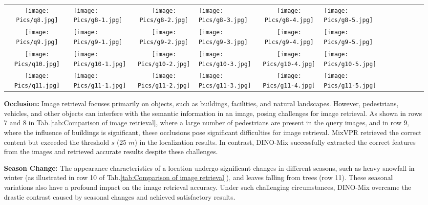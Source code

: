 \begin{table*}[!t]
\begin{tabular}{ c p{2cm} c p{2cm} c p{2cm} c p{2cm} c p{2cm} c p{2cm}}
 \texttt{[image: Pics/q8.jpg]}& \texttt{[image: Pics/g8-1.jpg]}&\texttt{[image: Pics/g8-2.jpg]}&\texttt{[image: Pics/g8-3.jpg]}&\texttt{[image: Pics/g8-4.jpg]}&\texttt{[image: Pics/g8-5.jpg]} \\
 \texttt{[image: Pics/q9.jpg]}& \texttt{[image: Pics/g9-1.jpg]}&\texttt{[image: Pics/g9-2.jpg]}&\texttt{[image: Pics/g9-3.jpg]}&\texttt{[image: Pics/g9-4.jpg]}&\texttt{[image: Pics/g9-5.jpg]} \\
 \texttt{[image: Pics/q10.jpg]}& \texttt{[image: Pics/g10-1.jpg]}&\texttt{[image: Pics/g10-2.jpg]}&\texttt{[image: Pics/g10-3.jpg]}&\texttt{[image: Pics/g10-4.jpg]}&\texttt{[image: Pics/g10-5.jpg]} \\
 \texttt{[image: Pics/q11.jpg]}& \texttt{[image: Pics/g11-1.jpg]}&\texttt{[image: Pics/g11-2.jpg]}&\texttt{[image: Pics/g11-3.jpg]}&\texttt{[image: Pics/g11-4.jpg]}&\texttt{[image: Pics/g11-5.jpg]} \\
    \hline
    \end{tabular}
    \label{tab:attention map visualization}
    \end{table*}
    
    \textbf{Occlusion:} Image retrieval focuses primarily on objects, such as buildings, facilities, and natural landscapes. However, pedestrians, vehicles, and other objects can interfere with the semantic information in an image, posing challenges for image retrieval. As shown in rows 7 and 8 in Tab.\ref{tab:Comparison of image retrieval}, where a large number of pedestrians are present in the query images, and in row 9, where the influence of buildings is significant, these occlusions pose significant difficulties for image retrieval. MixVPR retrieved the correct content but exceeded the threshold $s$ ($25$ $m$) in the localization results. In contrast, DINO-Mix successfully extracted the correct features from the images and retrieved accurate results despite these challenges.
    
    \textbf{Season Change:} The appearance characteristics of a location undergo significant changes in different seasons, such as heavy snowfall in winter (as illustrated in row 10 of Tab.\ref{tab:Comparison of image retrieval}), and leaves falling from trees (row 11). These seasonal variations also have a profound impact on the image retrieval accuracy. Under such challenging circumstances, DINO-Mix overcame the drastic contrast caused by seasonal changes and achieved satisfactory results.

